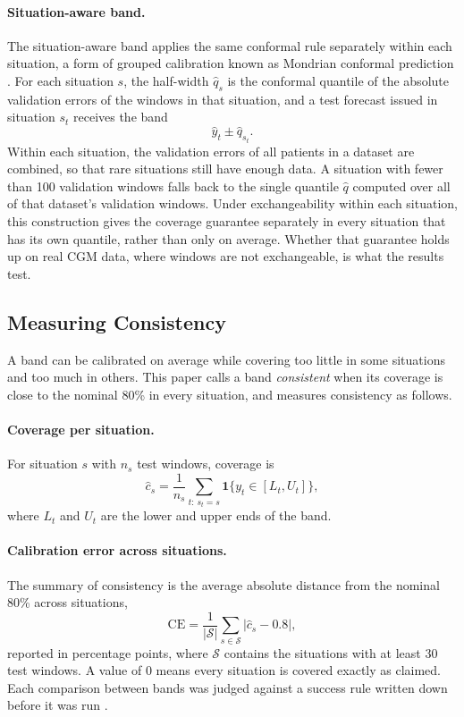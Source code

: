 \paragraph{Situation-aware band.} The situation-aware band applies the same conformal rule separately within each situation, a form of grouped calibration known as Mondrian conformal prediction \parencite{vovk2005alrw}. For each situation $s$, the half-width $\hat{q}_s$ is the conformal quantile of the absolute validation errors of the windows in that situation, and a test forecast issued in situation $s_t$ receives the band
\begin{equation}
\hat{y}_t \pm \hat{q}_{s_t}.
\end{equation}
Within each situation, the validation errors of all patients in a dataset are combined, so that rare situations still have enough data. A situation with fewer than 100 validation windows falls back to the single quantile $\hat{q}$ computed over all of that dataset's validation windows. Under exchangeability within each situation, this construction gives the coverage guarantee separately in every situation that has its own quantile, rather than only on average. Whether that guarantee holds up on real CGM data, where windows are not exchangeable, is what the results test.

\subsection{Measuring Consistency}
\label{sec:consistency}

A band can be calibrated on average while covering too little in some situations and too much in others. This paper calls a band \emph{consistent} when its coverage is close to the nominal 80\% in every situation, and measures consistency as follows.

\paragraph{Coverage per situation.} For situation $s$ with $n_s$ test windows, coverage is
\begin{equation}
\hat{c}_s = \frac{1}{n_s} \sum_{t:\, s_t = s} \mathbf{1}\{ y_t \in [L_t, U_t] \},
\end{equation}
where $L_t$ and $U_t$ are the lower and upper ends of the band.

\paragraph{Calibration error across situations.} The summary of consistency is the average absolute distance from the nominal 80\% across situations,
\begin{equation}
\mathrm{CE} = \frac{1}{|\mathcal{S}|} \sum_{s \in \mathcal{S}} \left| \hat{c}_s - 0.8 \right|,
\end{equation}
reported in percentage points, where $\mathcal{S}$ contains the situations with at least 30 test windows. A value of 0 means every situation is covered exactly as claimed. Each comparison between bands was judged against a success rule written down before it was run \parencite{nosek2018preregistration}.

